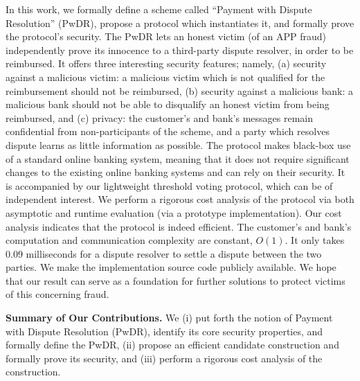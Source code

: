 In this work, we formally define a scheme called ``Payment with Dispute Resolution'' (PwDR),  propose a protocol which instantiates it, and formally prove the protocol's security.  The PwDR lets an honest victim (of an APP fraud)  independently prove its innocence to a third-party dispute resolver, in order to be reimbursed.  It offers three interesting security features; namely, (a) security against a malicious victim: a malicious victim  which is not qualified for the reimbursement should not be reimbursed, (b) security against a malicious bank: a malicious bank should not be able to disqualify an honest victim  from being reimbursed, and (c) privacy: the customer’s and bank’s messages remain confidential from non-participants of the scheme, and a party which resolves dispute  learns as little information as possible.  The  protocol makes black-box use of a standard  online banking system, meaning that it does not require significant changes to the existing online banking systems and can rely on their security. It is accompanied by our lightweight threshold voting protocol, which can be of independent interest. We perform a rigorous cost analysis of the protocol via both asymptotic and runtime  evaluation (via a prototype implementation). Our cost analysis indicates that the protocol is indeed efficient. The customer's and bank's computation and communication complexity are constant, $O(1)$. It only takes $0.09$ milliseconds for a dispute resolver to settle a dispute between the two parties. We  make  the implementation source code publicly available. We hope that our result can serve as a foundation for further solutions to protect victims of this concerning  fraud. 



 


  





\vspace{2mm}

\noindent\textbf{Summary of Our Contributions.} We (i) put forth the notion of Payment with Dispute Resolution (PwDR), identify its core security properties, and  formally define the PwDR, (ii) propose an efficient candidate construction  and formally prove its security, and (iii) perform a rigorous cost analysis of the construction.     




